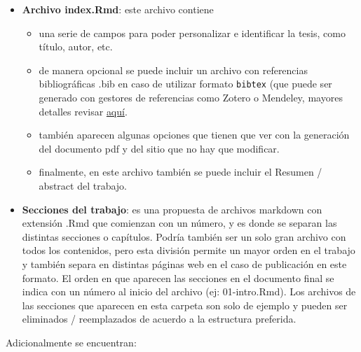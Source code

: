 \documentclass[12pt,twoside]{templates/facsothesis}
\providecommand{\tightlist}{%
  \setlength{\itemsep}{0pt}\setlength{\parskip}{0pt}}
\begin{document}
\begin{itemize}
\tightlist
\item
  \textbf{Archivo index.Rmd}: este archivo contiene

  \begin{itemize}
  \tightlist
  \item
    una serie de campos para poder personalizar e identificar la tesis, como título, autor, etc.
  \item
    de manera opcional se puede incluir un archivo con referencias bibliográficas .bib en caso de utilizar formato \texttt{bibtex} (que puede ser generado con gestores de referencias como Zotero o Mendeley, mayores detalles revisar \href{https://cienciasocialabierta.netlify.app/class/05-class/}{aquí}.
  \item
    también aparecen algunas opciones que tienen que ver con la generación del documento pdf y del sitio que no hay que modificar.
  \item
    finalmente, en este archivo también se puede incluir el Resumen / abstract del trabajo.
  \end{itemize}
\item
  \textbf{Secciones del trabajo}: es una propuesta de archivos markdown con extensión .Rmd que comienzan con un número, y es donde se separan las distintas secciones o capítulos. Podría también ser un solo gran archivo con todos los contenidos, pero esta división permite un mayor orden en el trabajo y también separa en distintas páginas web en el caso de publicación en este formato. El orden en que aparecen las secciones en el documento final se indica con un número al inicio del archivo (ej: 01-intro.Rmd). Los archivos de las secciones que aparecen en esta carpeta son solo de ejemplo y pueden ser eliminados / reemplazados de acuerdo a la estructura preferida.
\end{itemize}

Adicionalmente se encuentran:
\end{document}
